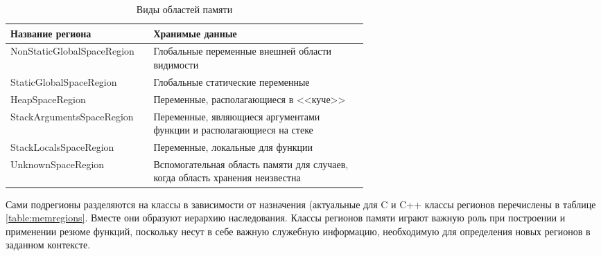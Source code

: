 \renewcommand\arraystretch{1.2}

\begin{table} [htbp]
  \centering
  \parbox{15cm}{\caption{Виды областей памяти}\label{table:regionspace}}
  \begin{tabular}{| l || p{0.6\linewidth} |}
  \hline
  \hline
  Название региона   & Хранимые данные \\
  \hline
  NonStaticGlobalSpaceRegion   & Глобальные переменные внешней области видимости  \\
  \hline
  StaticGlobalSpaceRegion      & Глобальные статические переменные    \\
  \hline
  HeapSpaceRegion  & Переменные, располагающиеся в <<куче>>    \\
  \hline
  StackArgumentsSpaceRegion & Переменные, являющиеся аргументами функции и располагающиеся на стеке   \\
  \hline
  StackLocalsSpaceRegion & Переменные, локальные для функции   \\
  \hline
  UnknownSpaceRegion & Вспомогательная область памяти для случаев, когда область хранения неизвестна \\
  \hline
  \hline
  \end{tabular}
\end{table}

Сами подрегионы разделяются на классы в зависимости от назначения (актуальные для C и C++ классы регионов перечислены в таблице \ref{table:memregions}. Вместе они образуют иерархию наследования. Классы регионов памяти играют важную роль при построении и применении резюме функций, поскольку несут в себе важную служебную информацию, необходимую для определения новых регионов в заданном контексте.

